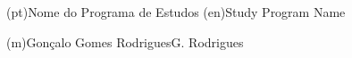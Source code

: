 \ntdegreename*(pt){Nome do Programa de Estudos}
\ntdegreename*(en){Study Program Name}




\ntauthorname(m){Gonçalo Gomes Rodrigues}{G. Rodrigues}

